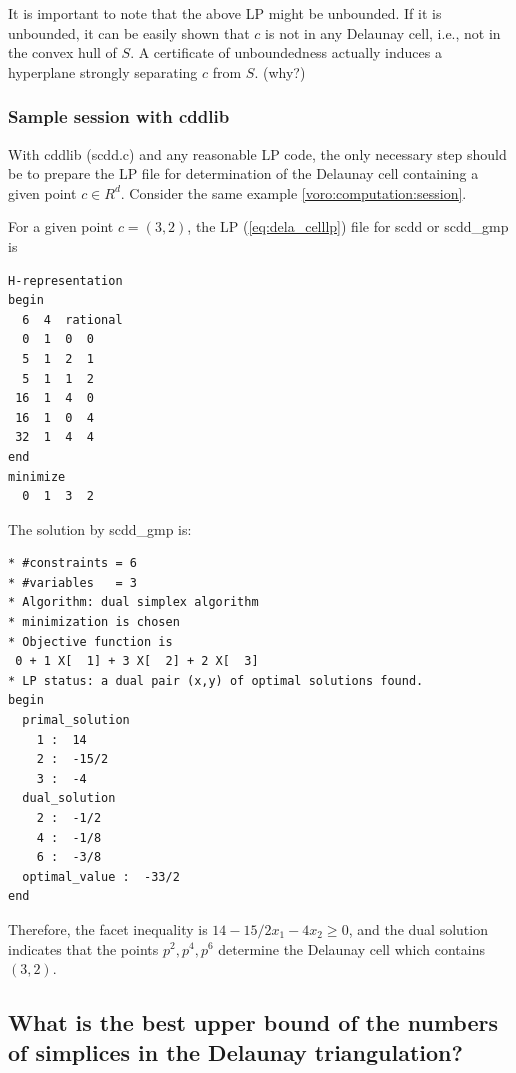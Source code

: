 \documentclass[[a4paper,12pt]{article}
\newcommand{\HBrule}{\noindent \hrulefill \medskip}
\newcommand{\HTrule}{\medskip \noindent \hrulefill}
\begin{document}
It is important to note that the above LP might be unbounded.  If it
is unbounded, it can be easily shown that $c$ is not in
any Delaunay cell, i.e., not in the convex hull of $S$.  A certificate
of unboundedness actually induces a hyperplane strongly separating
$c$ from $S$. (why?)

\subsubsection{Sample session with cddlib} 
\label{dela:computation:session}

\begin{small}

With cddlib (scdd.c) and any reasonable LP code, the only necessary step should be
to prepare the LP file for determination
of the Delaunay cell containing a given point $c\in R^d$.  
Consider the same example \ref{voro:computation:session}.  

For a given point $c = (3, 2)$, 
the LP (\ref{eq:dela_celllp}) file for scdd or scdd\_gmp is

\HTrule
\begin{verbatim}
H-representation
begin
  6  4  rational
  0  1  0  0
  5  1  2  1
  5  1  1  2
 16  1  4  0
 16  1  0  4
 32  1  4  4
end
minimize
  0  1  3  2
\end{verbatim}
\HBrule

\noindent
The solution by scdd\_gmp is:

\HTrule
\begin{verbatim}
* #constraints = 6
* #variables   = 3
* Algorithm: dual simplex algorithm
* minimization is chosen
* Objective function is
 0 + 1 X[  1] + 3 X[  2] + 2 X[  3]
* LP status: a dual pair (x,y) of optimal solutions found.
begin
  primal_solution
    1 :  14
    2 :  -15/2
    3 :  -4
  dual_solution
    2 :  -1/2
    4 :  -1/8
    6 :  -3/8
  optimal_value :  -33/2
end
\end{verbatim}
\HBrule

Therefore, the facet inequality is $ 14 - 15/2 x_1 - 4 x_2 \ge 0$, and
the dual solution indicates that the points $p^2, p^4, p^6$ determine
the Delaunay cell which contains $(3, 2)$.


\end{small}



\subsection{What is the best upper bound of the numbers of 
simplices in the Delaunay triangulation?} \label{voro:upperbound}
\end{document}
